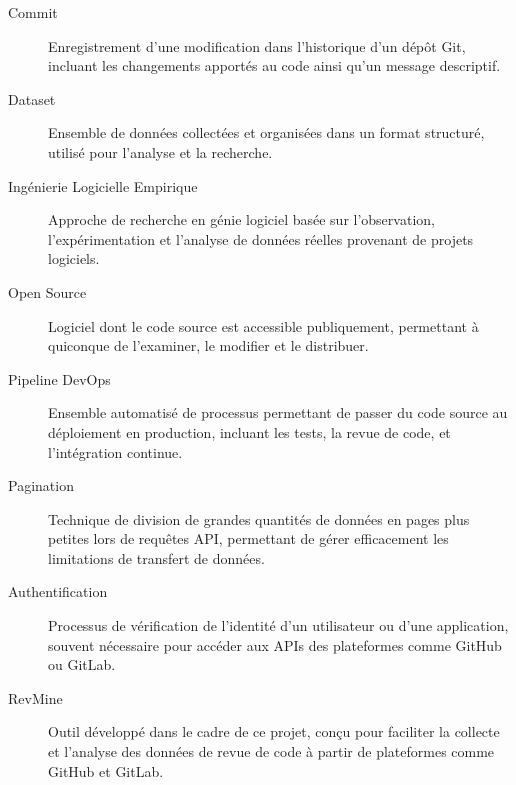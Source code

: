 \begin{description}
    \item[Commit] Enregistrement d'une modification dans l'historique d'un dépôt Git, incluant les changements apportés au code ainsi qu'un message descriptif.
    
    \item[Dataset] Ensemble de données collectées et organisées dans un format structuré, utilisé pour l'analyse et la recherche.
    
    \item[Ingénierie Logicielle Empirique] Approche de recherche en génie logiciel basée sur l'observation, l'expérimentation et l'analyse de données réelles provenant de projets logiciels.
    
    \item[Open Source] Logiciel dont le code source est accessible publiquement, permettant à quiconque de l'examiner, le modifier et le distribuer.
    
    \item[Pipeline DevOps] Ensemble automatisé de processus permettant de passer du code source au déploiement en production, incluant les tests, la revue de code, et l'intégration continue.
    
    \item[Pagination] Technique de division de grandes quantités de données en pages plus petites lors de requêtes API, permettant de gérer efficacement les limitations de transfert de données.
    
    \item[Authentification] Processus de vérification de l'identité d'un utilisateur ou d'une application, souvent nécessaire pour accéder aux APIs des plateformes comme GitHub ou GitLab.
    
    \item[RevMine] Outil développé dans le cadre de ce projet, conçu pour faciliter la collecte et l'analyse des données de revue de code à partir de plateformes comme GitHub et GitLab.
    
\end{description}

\clearpage